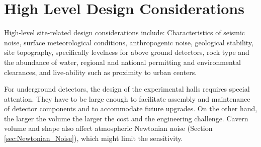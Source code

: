 \section{High Level Design Considerations}
\label{Req:Fac_Inf}
High-level site-related design considerations include: Characteristics of seismic noise, surface meteorological conditions, anthropogenic noise, geological stability, site topography, specifically levelness for above ground detectors, rock type and the abundance of water, regional and national permitting and environmental clearances, and live-ability such as proximity to urban centers.  


For underground detectors, the design of the experimental halls requires special attention. They have to be large enough to facilitate assembly and maintenance of detector components and to accommodate future upgrades. On the other hand, the larger the volume the larger the cost and the engineering challenge. Cavern volume and shape also affect atmospheric Newtonian noise (Section \ref{sec:Newtonian_Noise}), which might limit the sensitivity.

